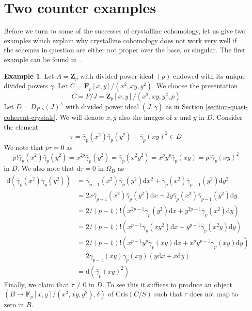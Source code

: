 \documentclass{stacks-project}
\theoremstyle{plain}
\theoremstyle{definition}
\newtheorem{example}[subsection]{Example}
\theoremstyle{remark}
\numberwithin{equation}{subsection}
\begin{document}
\section{Two counter examples}
\label{section-examples}

\noindent
Before we turn to some of the successes of crystalline cohomology,
let us give two examples which explain why crystalline cohomology
does not work very well if the schemes in question are either not
proper over the base, or singular. The first example can be found
in \cite{BO}.

\begin{example}
\label{example-torsion}
Let $A = \mathbf{Z}_p$ with divided power ideal $(p)$ endowed with
its unique divided powers $\gamma$. Let
$C = \mathbf{F}_p[x, y]/(x^2, xy, y^2)$. We choose the presentation
$$
C = P/J = \mathbf{Z}_p[x, y]/(x^2, xy, y^2, p)
$$
Let $D = D_{P, \gamma}(J)^\wedge$ with divided power ideal
$(\bar J, \bar \gamma)$ as in Section \ref{section-quasi-coherent-crystals}.
We will denote $x, y$ also the images of $x$ and $y$ in $D$.
Consider the element
$$
\tau = \bar\gamma_p(x^2)\bar\gamma_p(y^2) - \bar\gamma_p(xy)^2 \in D
$$
We note that $p\tau = 0$ as
$$
p! \bar\gamma_p(x^2) \bar\gamma_p(y^2) =
x^{2p} \bar\gamma_p(y^2) = \bar\gamma_p(x^2y^2) =
x^py^p \bar\gamma_p(xy) = p! \bar\gamma_p(xy)^2
$$
in $D$. We also note that $\text{d}\tau = 0$ in $\Omega_D$ as
\begin{align*}
\text{d}(\bar\gamma_p(x^2) \bar\gamma_p(y^2))
& =
\bar\gamma_{p - 1}(x^2)\bar\gamma_p(y^2)\text{d}x^2 +
\bar\gamma_p(x^2)\bar\gamma_{p - 1}(y^2)\text{d}y^2 \\
& =
2 x \bar\gamma_{p - 1}(x^2)\bar\gamma_p(y^2)\text{d}x +
2 y \bar\gamma_p(x^2)\bar\gamma_{p - 1}(y^2)\text{d}y \\
& =
2/(p - 1)!( x^{2p - 1} \bar\gamma_p(y^2)\text{d}x +
y^{2p - 1} \bar\gamma_p(x^2)\text{d}y ) \\
& =
2/(p - 1)!
(x^{p - 1} \bar\gamma_p(xy^2)\text{d}x +
y^{p - 1} \bar\gamma_p(x^2y)\text{d}y) \\
& =
2/(p - 1)!
(x^{p - 1}y^p \bar\gamma_p(xy)\text{d}x +
x^py^{p - 1} \bar\gamma_p(xy)\text{d}y) \\
& =
2 \bar\gamma_{p - 1}(xy) \bar\gamma_p(xy)(y\text{d}x + x \text{d}y) \\
& = 
\text{d}(\bar\gamma_p(xy)^2)
\end{align*}
Finally, we claim that $\tau \not = 0$ in $D$. To see this it suffices to
produce an object $(B \to \mathbf{F}_p[x, y]/(x^2, xy, y^2), \delta)$
of $\text{Cris}(C/S)$ such that $\tau$ does not map to zero in $B$.

\end{example}
\end{document}
